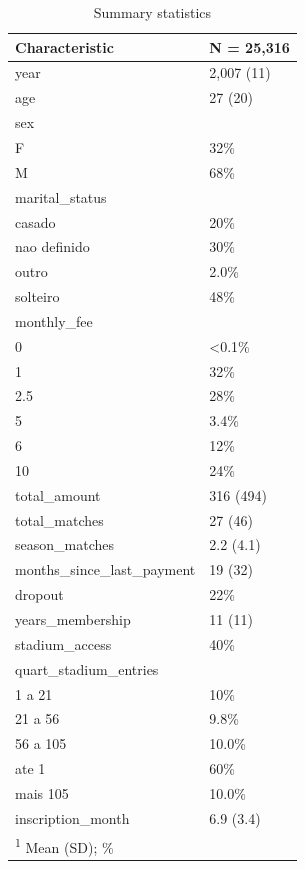 \documentclass[
  12pt,
]{article}
\begin{document}
\begin{table}

\caption{\label{tab:summarytable}Summary statistics}
\centering
\begin{tabular}[t]{ll}
\toprule
Characteristic & N = 25,316\\
\midrule
year & 2,007 (11)\\
age & 27 (20)\\
sex & \\
\hspace{1em}F & 32\%\\
\hspace{1em}M & 68\%\\
\addlinespace
marital\_status & \\
\hspace{1em}casado & 20\%\\
\hspace{1em}nao definido & 30\%\\
\hspace{1em}outro & 2.0\%\\
\hspace{1em}solteiro & 48\%\\
\addlinespace
monthly\_fee & \\
\hspace{1em}0 & <0.1\%\\
\hspace{1em}1 & 32\%\\
\hspace{1em}2.5 & 28\%\\
\hspace{1em}5 & 3.4\%\\
\addlinespace
\hspace{1em}6 & 12\%\\
\hspace{1em}10 & 24\%\\
total\_amount & 316 (494)\\
total\_matches & 27 (46)\\
season\_matches & 2.2 (4.1)\\
\addlinespace
months\_since\_last\_payment & 19 (32)\\
dropout & 22\%\\
years\_membership & 11 (11)\\
stadium\_access & 40\%\\
quart\_stadium\_entries & \\
\addlinespace
\hspace{1em}1 a 21 & 10\%\\
\hspace{1em}21 a 56 & 9.8\%\\
\hspace{1em}56 a 105 & 10.0\%\\
\hspace{1em}ate 1 & 60\%\\
\hspace{1em}mais 105 & 10.0\%\\
\addlinespace
inscription\_month & 6.9 (3.4)\\
\bottomrule
\multicolumn{2}{l}{\rule{0pt}{1em}\textsuperscript{1} Mean (SD); \%}\\
\end{tabular}
\end{table}
\end{document}

